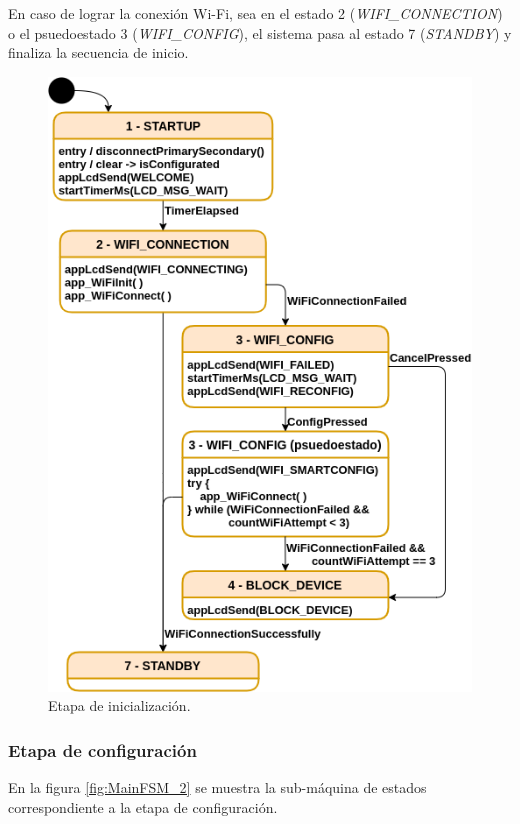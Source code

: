 En caso de lograr la conexión Wi-Fi, sea en el estado 2 (\textit{WIFI\_CONNECTION}) o el psuedoestado 3 (\textit{WIFI\_CONFIG}), el sistema pasa al estado 7 (\textit{STANDBY}) y finaliza la secuencia de inicio.

\pagebreak

\begin{figure}[ht]
	\centering
	\includegraphics[scale=1]{./Figures/MainFSM_1.png}
	\caption{Etapa de inicialización.}
	\label{fig:MainFSM_1}
\end{figure}


\subsubsection{Etapa de configuración}
\label{subsubsec:EtConf}
En la figura \ref{fig:MainFSM_2} se muestra la sub-máquina de estados correspondiente a la etapa de configuración. 

